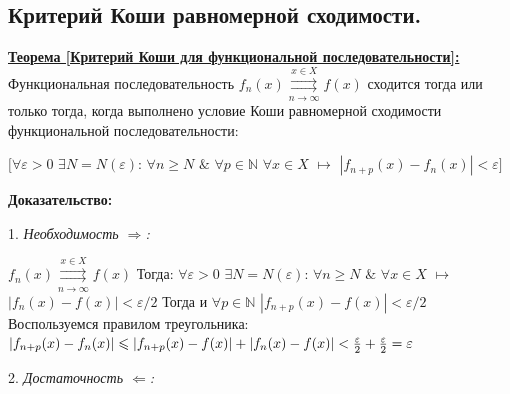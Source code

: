 \documentclass[a4paper,12pt]{article} %
\renewcommand {\geq}{\geqslant}
\renewcommand {\leq}{\leqslant}
\begin{document}
\subsection{Критерий Коши равномерной сходимости.}

\underline{\textbf{Теорема [Критерий Коши для функциональной последовательности]:}} Функциональная последовательность $f_n(x) \overset{x \in X}{\underset{n \rightarrow \infty}{\rightrightarrows}} f(x)$ сходится тогда или только тогда, когда выполнено условие Коши
равномерной сходимости функциональной последовательности: \newline

\hspace*{5mm}$\big[\forall \varepsilon > 0 $  $\exists N = N(\varepsilon)$: $\forall n \geq N$  $\&$ $\forall p \in  \mathds{N}$ $\forall x \in X$ $\longmapsto$  $|f_{n+p}(x) -f_n(x)| < \varepsilon\big]$

\noindent \textbf{Доказательство:} \newline

 1. \textit{Необходимость $\Rightarrow$:} \newline

\noindent $f_n(x) \overset{x \in X}{\underset{n \rightarrow \infty}{\rightrightarrows}} f(x)$ 
\newline \newline
Тогда: \newline
\hspace*{5mm}$\forall \varepsilon > 0$ $\exists N = N(\varepsilon)$:
$\forall n \geq N$ $\&$ $\forall x \in X$ $\longmapsto$ $|f_n(x) - f(x)| < \varepsilon / 2$ \newline
Тогда и 
\newline 
\hspace*{5mm}$\forall p \in \mathds{N}$ $|f_{n+p}(x) - f(x)| < \varepsilon / 2$
\newline \newline 
Воспользуемся правилом треугольника: \newline \newline
$|f_{n+p}(x) - f_n(x)| \leq |f_{n+p}(x) - f(x)| + |f_n(x) - f(x)| < {\varepsilon \over 2} + {\varepsilon \over 2} = \varepsilon$
\noindent  \newline \newline

2. \textit{Достаточность $\Leftarrow$:} \newline
\end{document}
